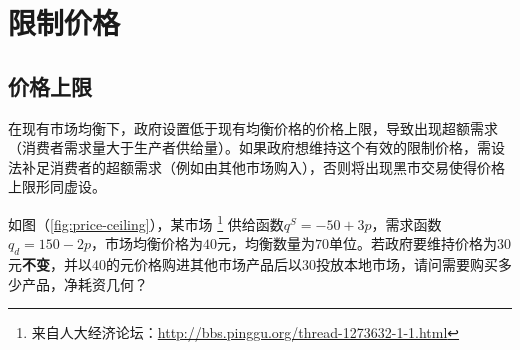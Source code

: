 \section{限制价格}

\subsection{价格上限}
在现有市场均衡下，政府设置低于现有均衡价格的价格上限，导致出现超额需求（消费者需求量大于生产者供给量）。如果政府想维持这个有效的限制价格，需设法补足消费者的超额需求（例如由其他市场购入），否则将出现黑市交易使得价格上限形同虚设。

如图（\ref{fig:price-ceiling}），某市场%
\footnote{来自人大经济论坛：{\url{http://bbs.pinggu.org/thread-1273632-1-1.html}}}%
供给函数$q^S=-50+3p$，需求函数$q_d=150-2p$，市场均衡价格为$40$元，均衡数量为$70$单位。若政府要维持价格为$30$元\textbf{不变}，并以$40$的元价格购进其他市场产品后以$30$投放本地市场，请问需要购买多少产品，净耗资几何？

